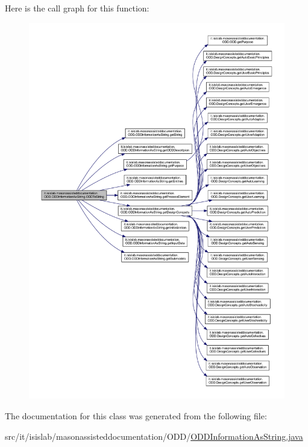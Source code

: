 Here is the call graph for this function\-:\nopagebreak
\begin{figure}[H]
\begin{center}
\leavevmode
\includegraphics[width=350pt]{classit_1_1isislab_1_1masonassisteddocumentation_1_1_o_d_d_1_1_o_d_d_information_as_string_ab14896c1ad0c20f9895a802bef0283fa_cgraph}
\end{center}
\end{figure}




The documentation for this class was generated from the following file\-:\begin{DoxyCompactItemize}
\item 
src/it/isislab/masonassisteddocumentation/\-O\-D\-D/\hyperlink{_o_d_d_information_as_string_8java}{O\-D\-D\-Information\-As\-String.\-java}\end{DoxyCompactItemize}
